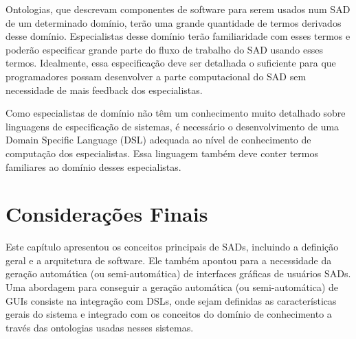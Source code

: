 Ontologias, que descrevam componentes de software para serem usados
num SAD de um determinado domínio, terão uma grande quantidade de
termos derivados desse domínio. Especialistas desse domínio terão
familiaridade com esses termos e poderão especificar grande parte
do fluxo de trabalho do SAD usando esses termos. Idealmente, essa
especificação deve ser detalhada o suficiente para que programadores
possam desenvolver a parte computacional do SAD sem necessidade de
mais feedback dos especialistas.

Como especialistas de domínio não têm um conhecimento muito detalhado
sobre linguagens de especificação de sistemas, é necessário o desenvolvimento
de uma \foreignlanguage{english}{Domain Specific Languag}e (DSL) adequada
ao nível de conhecimento de computação dos especialistas. Essa linguagem
também deve conter termos familiares ao domínio desses especialistas. 

\section{Considerações Finais}

Este capítulo apresentou os conceitos principais de SADs, incluindo
a definição geral e a arquitetura de software. Ele também apontou
para a necessidade da geração automática (ou semi\nobreakdash-automática)
de interfaces gráficas de usuários SADs. Uma abordagem para conseguir
a geração automática (ou semi\nobreakdash-automática) de GUIs consiste
na integração com DSLs, onde sejam definidas as características gerais
do sistema e integrado com os conceitos do domínio de conhecimento
a través das ontologias usadas nesses sistemas.
